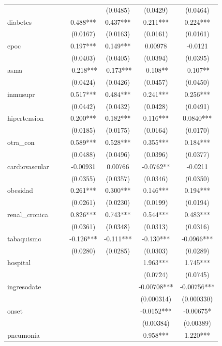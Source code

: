 \documentclass[]{article}
\begin{document}
\begin{tabular}{lcccccc}
 &  &  &  & (0.0485) & (0.0429) & (0.0464) \\
diabetes &  &  & 0.488*** & 0.437*** & 0.211*** & 0.224*** \\
 &  &  & (0.0167) & (0.0163) & (0.0161) & (0.0161) \\
epoc &  &  & 0.197*** & 0.149*** & 0.00978 & -0.0121 \\
 &  &  & (0.0403) & (0.0405) & (0.0394) & (0.0395) \\
asma &  &  & -0.218*** & -0.173*** & -0.108** & -0.107** \\
 &  &  & (0.0424) & (0.0426) & (0.0457) & (0.0450) \\
inmusupr &  &  & 0.517*** & 0.484*** & 0.241*** & 0.256*** \\
 &  &  & (0.0442) & (0.0432) & (0.0428) & (0.0491) \\
hipertension &  &  & 0.200*** & 0.182*** & 0.116*** & 0.0840*** \\
 &  &  & (0.0185) & (0.0175) & (0.0164) & (0.0170) \\
otra\_con &  &  & 0.589*** & 0.528*** & 0.355*** & 0.184*** \\
 &  &  & (0.0488) & (0.0496) & (0.0396) & (0.0377) \\
cardiovascular &  &  & -0.00931 & 0.00766 & -0.0762** & -0.0211 \\
 &  &  & (0.0355) & (0.0357) & (0.0346) & (0.0350) \\
obesidad &  &  & 0.261*** & 0.300*** & 0.146*** & 0.194*** \\
 &  &  & (0.0261) & (0.0230) & (0.0199) & (0.0194) \\
renal\_cronica &  &  & 0.826*** & 0.743*** & 0.544*** & 0.483*** \\
 &  &  & (0.0361) & (0.0348) & (0.0313) & (0.0316) \\
tabaquismo &  &  & -0.126*** & -0.111*** & -0.130*** & -0.0966*** \\
 &  &  & (0.0280) & (0.0285) & (0.0303) & (0.0289) \\
hospital &  &  &  &  & 1.963*** & 1.745*** \\
 &  &  &  &  & (0.0724) & (0.0745) \\
ingresodate &  &  &  &  & -0.00708*** & -0.00756*** \\
 &  &  &  &  & (0.000314) & (0.000330) \\
onset &  &  &  &  & -0.0152*** & -0.00675* \\
 &  &  &  &  & (0.00384) & (0.00389) \\
pneumonia &  &  &  &  & 0.958*** & 1.220*** \\

\end{tabular}
\end{document}

